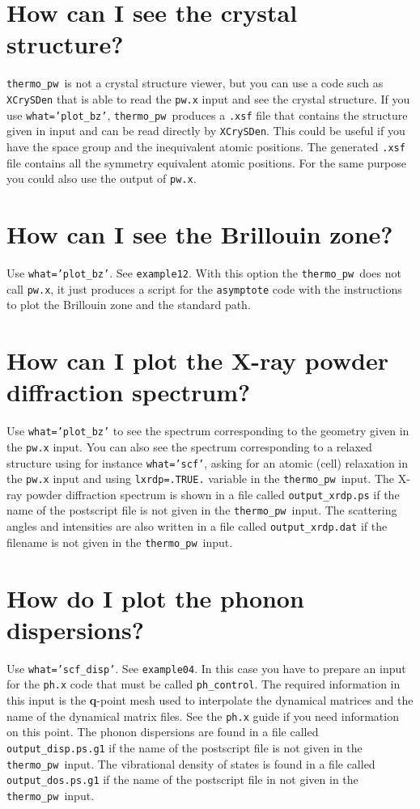 \documentclass[12pt,a4paper]{article}
\def\thermo{\texttt{thermo\_pw}}
\begin{document}
\section{\color{coral}How can I see the crystal structure?}
\thermo\ is not a crystal structure viewer, but you can use a code such
as \texttt{XCrySDen} that is able to read the \texttt{pw.x} input and
see the crystal structure. If you use \texttt{what='plot\_bz'}, 
\thermo\ produces a \texttt{.xsf} file that contains the structure given in
input and can be read directly by \texttt{XCrySDen}. This could
be useful if you have the space group and the inequivalent atomic positions.
The generated \texttt{.xsf} file contains all the symmetry equivalent 
atomic positions. For the same purpose you could also use the output
of \texttt{pw.x}.

\section{\color{coral}How can I see the Brillouin zone?}
Use \texttt{what='plot\_bz'}. See \texttt{example12}. With this option
the \thermo\ does not call \texttt{pw.x}, it just produces a script for
the \texttt{asymptote} code with the instructions to plot the Brillouin
zone and the standard path.

\section{\color{coral}How can I plot the X-ray powder diffraction spectrum?}
Use \texttt{what='plot\_bz'} to see the spectrum corresponding to
the geometry given in the \texttt{pw.x} input. You can also see the
spectrum corresponding to a relaxed structure using for instance
\texttt{what='scf'}, asking for an atomic (cell) relaxation in the \texttt{pw.x}
input and using \texttt{lxrdp=.TRUE.} variable in the \thermo\ input.
The X-ray powder diffraction spectrum is shown in a file called 
\texttt{output\_xrdp.ps} if the name of the postscript file is not
given in the \thermo\ input. The scattering angles and intensities
are also written in a file called \texttt{output\_xrdp.dat} if the filename
is not given in the \thermo\ input.

\section{\color{coral}How do I plot the phonon dispersions?}
Use \texttt{what='scf\_disp'}. See \texttt{example04}. In this case you
have to prepare an input for the \texttt{ph.x} code that must be
called \texttt{ph\_control}. The required information in this input
is the {\bf q}-point mesh used to interpolate the dynamical matrices and
the name of the dynamical matrix files.
See the \texttt{ph.x} guide if you need information on this point.
The phonon dispersions are found in a file called \texttt{output\_disp.ps.g1}
if the name of the postscript file is not given in the \thermo\ input.
The vibrational density of states is found in a file called 
\texttt{output\_dos.ps.g1} if the name of the postscript file in not
given in the \thermo\ input.
\end{document}
